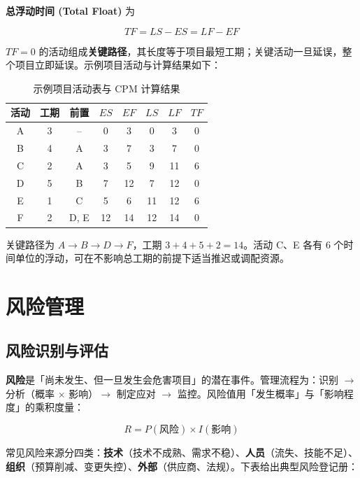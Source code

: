 \textbf{总浮动时间 (Total Float)} 为

\begin{equation}
    TF = LS - ES = LF - EF
\end{equation}

$TF=0$ 的活动组成\textbf{关键路径}，其长度等于项目最短工期；关键活动一旦延误，整个项目立即延误。示例项目活动与计算结果如下：

\begin{table}[H]
\centering
\caption{示例项目活动表与 CPM 计算结果}
\begin{tabulary}{\textwidth}{CCCCCCCC}
\toprule
活动 & 工期 & 前置 & $ES$ & $EF$ & $LS$ & $LF$ & $TF$ \\
\midrule
A & 3 & -- & 0 & 3 & 0 & 3 & 0 \\
B & 4 & A & 3 & 7 & 3 & 7 & 0 \\
C & 2 & A & 3 & 5 & 9 & 11 & 6 \\
D & 5 & B & 7 & 12 & 7 & 12 & 0 \\
E & 1 & C & 5 & 6 & 11 & 12 & 6 \\
F & 2 & D, E & 12 & 14 & 12 & 14 & 0 \\
\bottomrule
\end{tabulary}
\end{table}

\noindent 关键路径为 $A \to B \to D \to F$，工期 $3+4+5+2=14$。活动 C、E 各有 6 个时间单位的浮动，可在不影响总工期的前提下适当推迟或调配资源。

\section{风险管理}

\subsection{风险识别与评估}

\textbf{风险}是「尚未发生、但一旦发生会危害项目」的潜在事件。管理流程为：识别 $\to$ 分析（概率 $\times$ 影响）$\to$ 制定应对 $\to$ 监控。风险值用「发生概率」与「影响程度」的乘积度量：

\begin{equation}
    R = P(\text{风险}) \times I(\text{影响})
\end{equation}

\noindent 常见风险来源分四类：\textbf{技术}（技术不成熟、需求不稳）、\textbf{人员}（流失、技能不足）、\textbf{组织}（预算削减、变更失控）、\textbf{外部}（供应商、法规）。下表给出典型风险登记册：

